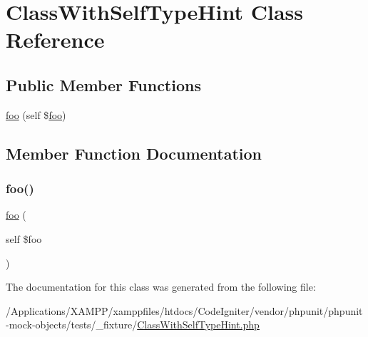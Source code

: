 \hypertarget{class_class_with_self_type_hint}{}\section{Class\+With\+Self\+Type\+Hint Class Reference}
\label{class_class_with_self_type_hint}
\subsection*{Public Member Functions}
\begin{DoxyCompactItemize}
\item 
\mbox{\hyperlink{class_class_with_self_type_hint_a13b201a9b9c83d64e3955722380641eb}{foo}} (self \$\mbox{\hyperlink{interfacefoo}{foo}})
\end{DoxyCompactItemize}


\subsection{Member Function Documentation}
\mbox{\label{class_class_with_self_type_hint_a13b201a9b9c83d64e3955722380641eb}} 
\subsubsection{\texorpdfstring{foo()}{foo()}}
{\footnotesize\ttfamily \mbox{\hyperlink{interfacefoo}{foo}} (\begin{DoxyParamCaption}\item[{self}]{\$foo }\end{DoxyParamCaption})}



The documentation for this class was generated from the following file\+:\begin{DoxyCompactItemize}
\item 
/\+Applications/\+X\+A\+M\+P\+P/xamppfiles/htdocs/\+Code\+Igniter/vendor/phpunit/phpunit-\/mock-\/objects/tests/\+\_\+fixture/\mbox{\hyperlink{_class_with_self_type_hint_8php}{Class\+With\+Self\+Type\+Hint.\+php}}\end{DoxyCompactItemize}

